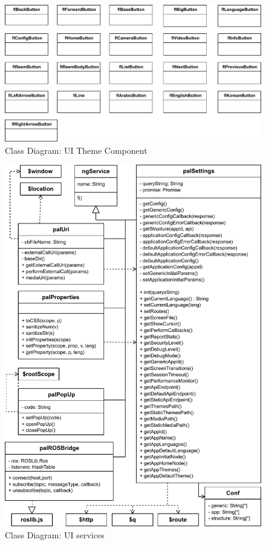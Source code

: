 \begin{figure}
    \centering
    \includegraphics{figures/design-class-themecomponents.pdf}
    \caption{Class Diagram: UI Theme Component}
    \label{fig:class-themecomponent}
\end{figure}

\begin{figure}[htb]
    \centering
    \includegraphics{figures/design-class-services.pdf}
    \caption{Class Diagram: UI services}
    \label{fig:class-services}
\end{figure}

